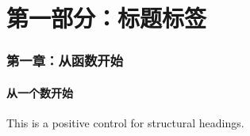 \documentclass[11pt,a4paper]{article}
\begin{document}
\tableofcontents
\part{第一部分：标题标签}
\section{第一章：从函数开始}
\subsection{从一个数开始}
This is a positive control for structural headings.
\end{document}
